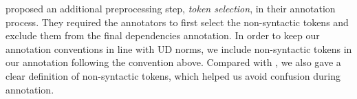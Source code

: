 \documentclass[11pt,a4paper]{article}
\newcommand{\nascomment}[1]{\textcolor{blue}{[#1 ---\textsc{nas}]}}
\begin{document}

 proposed an additional
preprocessing step, \emph{token selection}, in their annotation process.
They required the annotators to first select the non-syntactic
tokens and exclude them from the final dependencies annotation.
In order to keep our annotation conventions in line with UD norms,
we include non-syntactic tokens in our annotation following the
convention above. Compared with \citet{kong-EtAl:2014:EMNLP2014},
we also gave a clear definition of non-syntactic tokens, which helped
us avoid confusion during annotation.

\end{document}
